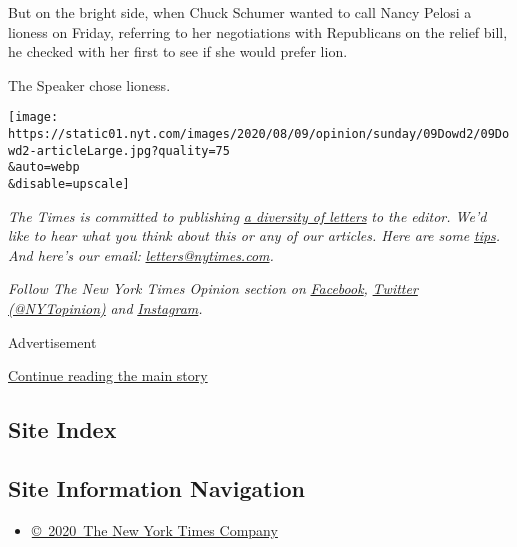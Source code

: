 But on the bright side, when Chuck Schumer wanted to call Nancy Pelosi a
lioness on Friday, referring to her negotiations with Republicans on the
relief bill, he checked with her first to see if she would prefer lion.

The Speaker chose lioness.

\texttt{[image: https://static01.nyt.com/images/2020/08/09/opinion/sunday/09Dowd2/09Dowd2-articleLarge.jpg?quality=75\\\&auto=webp\\\&disable=upscale]}

\emph{The Times is committed to publishing}
\href{https://www.nytimes.com/2019/01/31/opinion/letters/letters-to-editor-new-york-times-women.html}{\emph{a
diversity of letters}} \emph{to the editor. We'd like to hear what you
think about this or any of our articles. Here are some}
\href{https://help.nytimes.com/hc/en-us/articles/115014925288-How-to-submit-a-letter-to-the-editor}{\emph{tips}}\emph{.
And here's our email:}
\href{mailto:letters@nytimes.com}{\emph{letters@nytimes.com}}\emph{.}

\emph{Follow The New York Times Opinion section on}
\href{https://www.facebook.com/nytopinion}{\emph{Facebook}}\emph{,}
\href{http://twitter.com/NYTOpinion}{\emph{Twitter (@NYTopinion)}}
\emph{and}
\href{https://www.instagram.com/nytopinion/}{\emph{Instagram}}\emph{.}

Advertisement

\protect\hyperlink{after-bottom}{Continue reading the main story}

\hypertarget{site-index}{%
\subsection{Site Index}\label{site-index}}

\hypertarget{site-information-navigation}{%
\subsection{Site Information
Navigation}\label{site-information-navigation}}

\begin{itemize}
\tightlist
\item
  \href{https://help.nytimes.com/hc/en-us/articles/115014792127-Copyright-notice}{©~2020~The
  New York Times Company}
\end{itemize}

